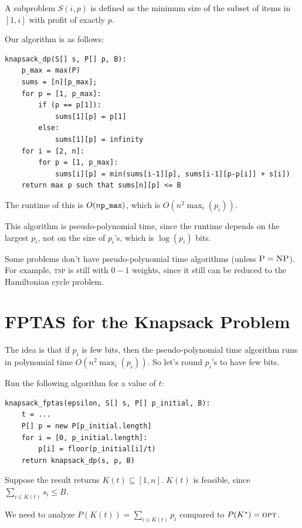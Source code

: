                 A subproblem $S(i, p)$ is defined as the minimum size of the subset of items in $[1, i]$ with profit of exactly $p$.

                Our algorithm is as follows:
                \begin{lstlisting}
knapsack_dp(S[] s, P[] p, B):
    p_max = max(P)
    sums = [n][p_max];
    for p = [1, p_max]:
        if (p == p[1]):
            sums[1][p] = p[1]
        else:
            sums[1][p] = infinity
    for i = [2, n]:
        for p = [1, p_max]:
            sums[i][p] = min(sums[i-1][p], sums[i-1][p-p[i]] + s[i])
    return max p such that sums[n][p] <= B
                \end{lstlisting}

                The runtime of this is $O(n \verb|p_max|)$, which is $O(n^2 \max_i(p_i))$.

                This algorithm is pseudo-polynomial time, since the runtime depends on the largest $p_i$, not on the size of $p_i$'s, which is $\log(p_i)$ bits.

                Some \npcomplete problems don't have pseudo-polynomial time algorithms (unless $\textsc{P} = \textsc{NP}$).
                For example, \textsc{tsp} is still \npcomplete with $0-1$ weights, since it still can be reduced to the Hamiltonian cycle problem.
            \section{FPTAS for the Knapsack Problem} %
            \label{sec:fptas_for_the_knapsack_problem}
                The idea is that if $p_i$ is few bits, then the pseudo-polynomial time algorithm runs in polynomial time $O(n^2 \max_i (p_i))$.
                So let's round $p_i$'s to have few bits.

                Run the following algorithm for a value of $t$:
                \begin{lstlisting}
knapsack_fptas(epsilon, S[] s, P[] p_initial, B):
    t = ...
    P[] p = new P[p_initial.length]
    for i = [0, p_initial.length]:
        p[i] = floor(p_initial[i]/t)
    return knapsack_dp(s, p, B)
                \end{lstlisting}
                Suppose the result returns $K(t) \subseteq [1, n]$.
                $K(t)$ is feasible, since $\sum_{i \in K(t)} s_i \le B$.

                We need to analyze $P(K(t)) = \sum_{i \in K(t)} p_i$ compared to $P(K^*) = \textsc{opt}$.

